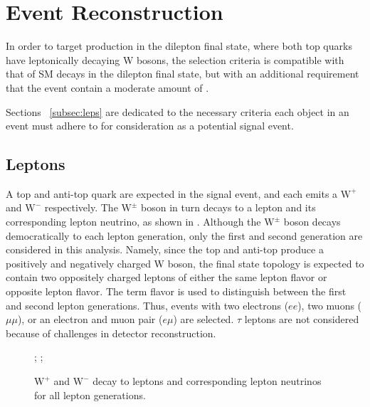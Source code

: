 \chapter{Event Reconstruction}
\label{chap:selection}

In order to target \ttDM production in the dilepton final state, where both top quarks have leptonically decaying W bosons, the selection criteria is compatible with that of SM \ttbar decays in the dilepton final state, but with an additional requirement that the event contain a moderate amount of \MET.

Sections ~\ref{subsec:leps} are dedicated to the necessary criteria each object in an event must adhere to for consideration as a potential signal event.

\section{Leptons}
\label{sec:leps}
A top and anti-top quark are expected in the signal event, and each emits a $\mathrm{W^+}$ and $\mathrm{W^-}$ respectively. The $\mathrm{W^\pm}$ boson in turn decays to a lepton and its corresponding lepton neutrino, as shown in . Although the $\mathrm{W^\pm}$ boson decays democratically to each lepton generation, only the first and second generation are considered in this analysis. Namely, since the top and anti-top produce a positively and negatively charged W boson, the final state topology is expected to contain two oppositely charged leptons of either the same lepton flavor or opposite lepton flavor. The term flavor is used to distinguish between the first and second lepton generations. Thus, events with two electrons ($ee$), two muons ($\mu\mu$), or an electron and muon pair ($e\mu$) are selected. $\tau$ leptons are not considered because of challenges in detector reconstruction. 

\begin{figure}
  ;
  ;
  \caption{$\mathrm{W^+}$ and $\mathrm{W^-}$ decay to leptons and corresponding lepton neutrinos for all lepton generations.}
  \label{fig:Wdecay}
\end{figure}


